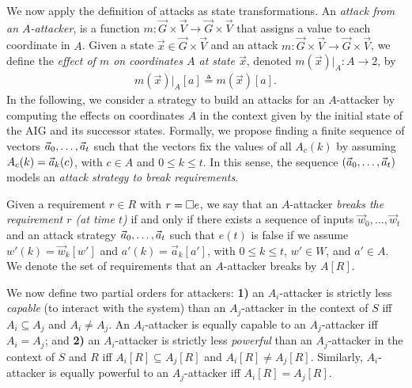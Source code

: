 We now apply the definition of attacks as state transformations. An \emph{attack from an $A$-attacker}, is a function $m\colon \vec{G}\times \vec{V}\rightarrow \vec{G}\times \vec{V}$ that assigns a value to each coordinate in $A$. Given a state $\vec{x}\in \vec{G}\times \vec{V}$ and an attack $m\colon \vec{G}\times \vec{V}\rightarrow \vec{G}\times \vec{V}$, we define the \emph{ effect of $m$ on coordinates $A$ at state $\vec{x}$}, denoted $m(\vec{x})|_A\colon A\rightarrow 2$, by
\begin{align}
	m(\vec{x})|_{A}[a]\triangleq m(\vec{x})[a].
\end{align}
In the following, we consider a strategy to build an attacks for an $A$-attacker by computing the effects on coordinates $A$ in the context given by the initial state of the AIG and its successor states. Formally, we propose finding a finite sequence of vectors $\vec{a}_0,  \ldots, \vec{a}_t$ such that the vectors fix the values of all $A_c(k)$ by assuming $A_c(k)=\vec{a}_k(c)$, with $c\in A$ and $0 \leq k \leq t$. In this sense, the sequence $(\vec{a}_0, \ldots, \vec{a}_t)$ models an \emph{attack strategy to break requirements}.

\begin{definition}
\label{def:brokenRequirement}
Given a requirement $r\in R$ with $r={{\square}} e$, we say that an $A$-attacker \emph{breaks the requirement $r$ (at time $t$)} if and only if there exists a sequence of inputs $\vec{w}_0, \ldots, \vec{w}_t$ and an attack strategy $\vec{a}_0, \ldots, \vec{a}_t$ such that $e(t)$ is false if we assume $w'(k)=\vec{w}_k[w']$ and $a'(k)=\vec{a}_k[a']$, with $0\leq k\leq t$, $w'\in W$, and $a'\in A$. We denote the set of requirements that an $A$-attacker breaks by $A[R]$. 
\end{definition}

We now define two partial orders for attackers: \textbf{1)} an $A_i$-attacker is strictly less \emph{capable} (to interact with the system) than an $A_j$-attacker in the 
context of $S$ %
iff $A_i\subseteq A_j$ and $A_i \neq A_j$. An {$A_i$-attacker is equally capable to an $A_j$-attacker iff $A_i= A_j$}; and \textbf{2)} an $A_i$-attacker is strictly less \emph{powerful} than an $A_j$-attacker in the 
context of $S$ and $R$ %
iff $A_i[R]\subseteq A_j[R]$ and $A_i[R]\neq A_j[R]$. Similarly, {$A_i$-attacker is equally powerful to an $A_j$-attacker iff $A_i[R]= A_j[R]$}. %

